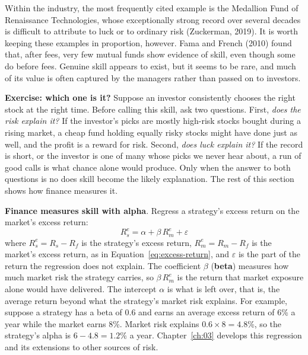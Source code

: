 \begin{itemize}
\begin{enumerate}
  \end{enumerate}

  Within the industry, the most frequently cited example is the Medallion
  Fund of Renaissance Technologies, whose exceptionally strong record over
  several decades is difficult to attribute to luck or to ordinary risk
  (Zuckerman, 2019). It is worth keeping these examples in proportion,
  however. Fama and French (2010) found that, after fees, very few mutual
  funds show evidence of skill, even though some do before fees. Genuine
  skill appears to exist, but it seems to be rare, and much of its value is
  often captured by the managers rather than passed on to investors.
  
  
\end{itemize}

\noindent\textbf{Exercise: which one is it?} Suppose an investor
consistently chooses the right stock at the right time. Before calling this
skill, ask two questions. First, \emph{does the risk explain it?} If the
investor's picks are mostly high-risk stocks bought during a rising market,
a cheap fund holding equally risky stocks might have done just as well, and
the profit is a reward for risk. Second, \emph{does luck explain it?} If the
record is short, or the investor is one of many whose picks we never hear
about, a run of good calls is what chance alone would produce. Only when the
answer to both questions is no does skill become the likely explanation. The
rest of this section shows how finance measures it.

\textbf{Finance measures skill with alpha}. Regress a strategy's excess return on the market's excess return:
\begin{equation}
  R^{e}_{s} = \alpha + \beta\, R^{e}_{m} + \varepsilon \nonumber
\end{equation}
where $R^{e}_{s} = R_s - R_f$ is the strategy's excess return, $R^{e}_{m} = R_m - R_f$ is the market's excess return, as in Equation~\eqref{eq:excess-return}, and $\varepsilon$ is the part of the return the regression does not explain. The coefficient $\beta$ (\textbf{beta}) measures how much market risk the strategy carries, so $\beta\, R^{e}_{m}$ is the return that market exposure alone would have delivered. The intercept $\alpha$ is what is left over, that is, the average return beyond what the strategy's market risk explains. For example, suppose a strategy has a beta of 0.6 and earns an average excess return of 6\% a year while the market earns 8\%. Market risk explains $0.6 \times 8 = 4.8$\%, so the strategy's alpha is $6 - 4.8 = 1.2$\% a year. Chapter~\ref{ch:03} develops this regression and its extensions to other sources of risk.


